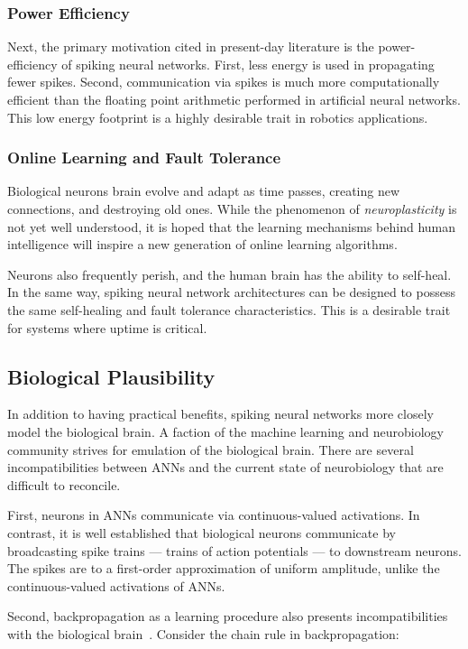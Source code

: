 \documentclass[fyp]{socreport}
\begin{document}
\subsubsection{Power Efficiency}
Next, the primary motivation cited in present-day literature is the
power-efficiency of spiking neural networks. First, less energy is used in
propagating fewer spikes. Second, communication via spikes is much more
computationally efficient than the floating point arithmetic performed in
artificial neural networks. This low energy footprint is a highly desirable
trait in robotics applications.

\subsubsection{Online Learning and Fault Tolerance}

Biological neurons brain evolve and adapt as time passes, creating new
connections, and destroying old ones. While the phenomenon of
\emph{neuroplasticity} is not yet well understood, it is hoped that the learning
mechanisms behind human intelligence will inspire a new generation of online
learning algorithms.

Neurons also frequently perish, and the human brain has the ability to
self-heal. In the same way, spiking neural network architectures can be designed
to possess the same self-healing and fault tolerance characteristics. This is a
desirable trait for systems where uptime is critical.

\subsection{Biological Plausibility\label{bioplausible}}
In addition to having practical benefits, spiking neural networks more closely
model the biological brain. A faction of the machine learning and neurobiology
community strives for emulation of the biological brain. There are several
incompatibilities between ANNs and the current state of neurobiology that are
difficult to reconcile.

First, neurons in ANNs communicate via continuous-valued activations. In
contrast, it is well established that biological neurons communicate by
broadcasting spike trains --- trains of action potentials --- to downstream
neurons. The spikes are to a first-order approximation of uniform amplitude,
unlike the continuous-valued activations of ANNs.

Second, backpropagation as a learning procedure also presents incompatibilities
with the biological brain~\cite{TAVANAEI201947}. Consider the chain rule in
backpropagation:
\end{document}

